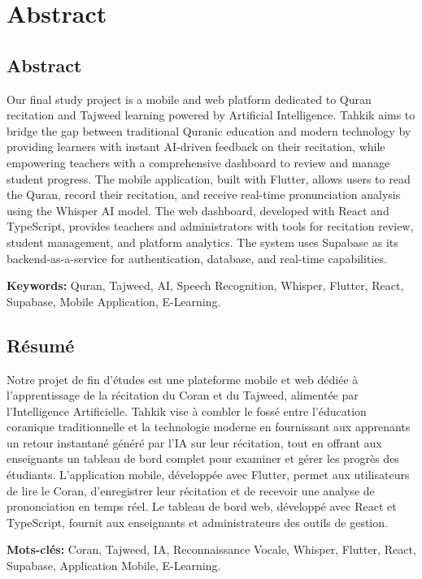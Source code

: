 \chapter*{Abstract}

\section*{Abstract}
Our final study project is a mobile and web platform dedicated to Quran recitation and Tajweed learning powered by Artificial Intelligence. Tahkik aims to bridge the gap between traditional Quranic education and modern technology by providing learners with instant AI-driven feedback on their recitation, while empowering teachers with a comprehensive dashboard to review and manage student progress. The mobile application, built with Flutter, allows users to read the Quran, record their recitation, and receive real-time pronunciation analysis using the Whisper AI model. The web dashboard, developed with React and TypeScript, provides teachers and administrators with tools for recitation review, student management, and platform analytics. The system uses Supabase as its backend-as-a-service for authentication, database, and real-time capabilities.

\textbf{Keywords:} Quran, Tajweed, AI, Speech Recognition, Whisper, Flutter, React, Supabase, Mobile Application, E-Learning.

\vspace{1cm}

\section*{R\'esum\'e}
Notre projet de fin d'\'etudes est une plateforme mobile et web d\'edi\'ee \`a l'apprentissage de la r\'ecitation du Coran et du Tajweed, aliment\'ee par l'Intelligence Artificielle. Tahkik vise \`a combler le foss\'e entre l'\'education coranique traditionnelle et la technologie moderne en fournissant aux apprenants un retour instantan\'e g\'en\'er\'e par l'IA sur leur r\'ecitation, tout en offrant aux enseignants un tableau de bord complet pour examiner et g\'erer les progr\`es des \'etudiants. L'application mobile, d\'evelopp\'ee avec Flutter, permet aux utilisateurs de lire le Coran, d'enregistrer leur r\'ecitation et de recevoir une analyse de prononciation en temps r\'eel. Le tableau de bord web, d\'evelopp\'e avec React et TypeScript, fournit aux enseignants et administrateurs des outils de gestion.

\textbf{Mots-cl\'es:} Coran, Tajweed, IA, Reconnaissance Vocale, Whisper, Flutter, React, Supabase, Application Mobile, E-Learning.


\newpage

